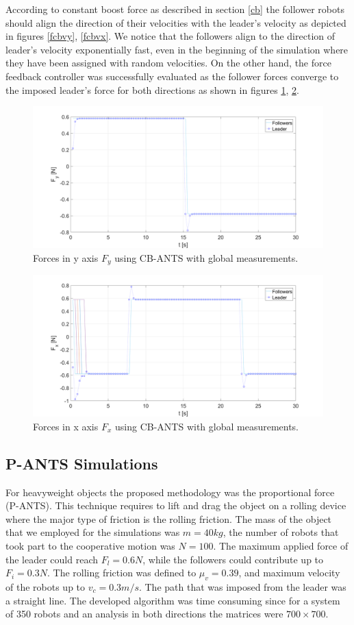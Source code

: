 \documentclass[letterpaper, 10 pt, conference]{ieeeconf}
\begin{document}
According to constant boost force as described in section \ref{cb} the follower robots should align the direction of their velocities with the leader's velocity as depicted in figures \ref{fcbvy}, \ref{fcbvx}. We notice that the followers align to the direction of leader's velocity exponentially fast, even in the beginning of the simulation where they have been assigned with random velocities. On the other hand, the force feedback controller was successfully evaluated as the follower forces converge to the imposed leader's force for both directions as shown in figures \ref{fcbfy}, \ref{fcbfx}.
\begin{figure}[!h]
	\includegraphics[width=.53\textwidth]{figures/CB_ANTS_Fy.png}
	\centering
	\caption{Forces in y axis $F_y$ using CB-ANTS with global measurements.}
	\label{fcbfy}
\end{figure}
\begin{figure}[!h]
	\includegraphics[width=.53\textwidth]{figures/CB_ANTS_Fx.png}
	\centering
	\caption{Forces in x axis $F_x$ using CB-ANTS with global measurements.}
	\label{fcbfx}
\end{figure}


\subsection{P-ANTS Simulations}
For heavyweight objects the proposed methodology was the proportional force (P-ANTS). This technique requires to lift and drag the object on a rolling device where the major type of friction is the rolling friction. The mass of the object that we employed for the simulations was $m=40kg$, the number of robots that took part to the cooperative motion was $N=100$. The maximum applied force of the leader could reach $F_l=0.6N$, while the followers could contribute up to $F_i=0.3N$. The rolling friction was defined to $\mu_v=0.39$, and maximum velocity of the robots up to $v_c=0.3m/s$. The path that was imposed from the leader was a straight line. The developed algorithm was time consuming since for a system of 350 robots and an analysis in both directions the matrices were $700 \times 700$.
\end{document}
